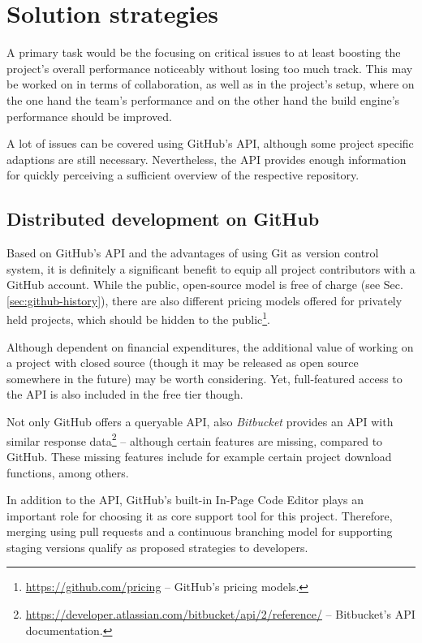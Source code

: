\section{Solution strategies}
\label{sec:solution-strategies}

A primary task would be the focusing on critical issues to at least boosting the project's overall performance noticeably without losing too much track. This may be worked on in terms of collaboration, as well as in the project's setup, where on the one hand the team's performance and on the other hand the build engine's performance should be improved.

A lot of issues can be covered using GitHub's API, although some project specific adaptions are still necessary. Nevertheless, the API provides enough information for quickly perceiving a sufficient overview of the respective repository.


\subsection{Distributed development on GitHub}
\label{sec:solutions-distributeddevelopment}

Based on GitHub's API and the advantages of using Git as version control system, it is definitely a significant benefit to equip all project contributors with a GitHub account. While the public, open-source model is free of charge (see Sec. \ref{sec:github-history}), there are also different pricing models offered for privately held projects, which should be hidden to the public\footnote{\url{https://github.com/pricing} -- GitHub's pricing models.}.

Although dependent on financial expenditures, the additional value of working on a project with closed source (though it may be released as open source somewhere in the future) may be worth considering. Yet, full-featured access to the API is also included in the free tier though.

Not only GitHub offers a queryable API, also \emph{Bitbucket} provides an API with similar response data\footnote{\url{https://developer.atlassian.com/bitbucket/api/2/reference/} -- Bitbucket's API documentation.} -- although certain features are missing, compared to GitHub. These missing features include for example certain project download functions, among others.

In addition to the API, GitHub's built-in In-Page Code Editor plays an important role for choosing it as core support tool for this project. Therefore, merging using pull requests and a continuous branching model for supporting staging versions qualify as proposed strategies to developers.


